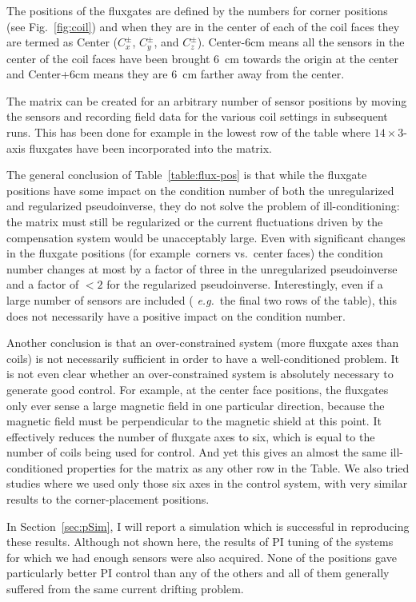 The positions of the fluxgates are defined by the numbers for corner
positions (see Fig.~\ref{fig:coil}) and when they are in the center of
each of the coil faces they are termed as Center ($C_x^\pm$, $C_y^\pm$, and
$C_z^\pm$). Center-6cm means all the sensors in the center of the coil
faces have been brought 6~cm towards the origin at the center and
Center+6cm means they are 6~cm farther away from the center.

The matrix can be created for an arbitrary number of sensor positions
by moving the sensors and recording field data for the various coil
settings in subsequent runs.  This has been done for example in the
lowest row of the table where $14\times 3$-axis fluxgates have been
incorporated into the matrix.

The general conclusion of Table~\ref{table:flux-pos} is that while the
fluxgate positions have some impact on the condition number of both
the unregularized and regularized pseudoinverse, they do not solve the
problem of ill-conditioning: the matrix must still be regularized or
the current fluctuations driven by the compensation system would be
unacceptably large.  Even with significant changes in the fluxgate
positions (for example~corners vs.~center faces) the condition number
changes at most by a factor of three in the unregularized
pseudoinverse and a factor of $<2$ for the regularized pseudoinverse.
Interestingly, even if a large number of sensors are included ({\it
e.g.}~the final two rows of the table), this does not necessarily have
a positive impact on the condition number.

Another conclusion is that an over-constrained system (more fluxgate
axes than coils) is not necessarily sufficient in order to have a
well-conditioned problem.  It is not even clear whether an
over-constrained system is absolutely necessary to generate good
control.  For example, at the center face positions, the fluxgates
only ever sense a large magnetic field in one particular direction,
because the magnetic field must be perpendicular to the magnetic
shield at this point.  It effectively reduces the number of fluxgate
axes to six, which is equal to the number of coils being used for
control.  And yet this gives an almost the same ill-conditioned
properties for the matrix as any other row in the Table.  We also
tried studies where we used only those six axes in the control system,
with very similar results to the corner-placement positions.

In Section~\ref{sec:pSim}, I will report a simulation which is
successful in reproducing these results.  Although not shown here, the
results of PI tuning of the systems for which we had enough sensors
were also acquired.  None of the positions gave particularly better PI
control than any of the others and all of them generally suffered from
the same current drifting problem.

